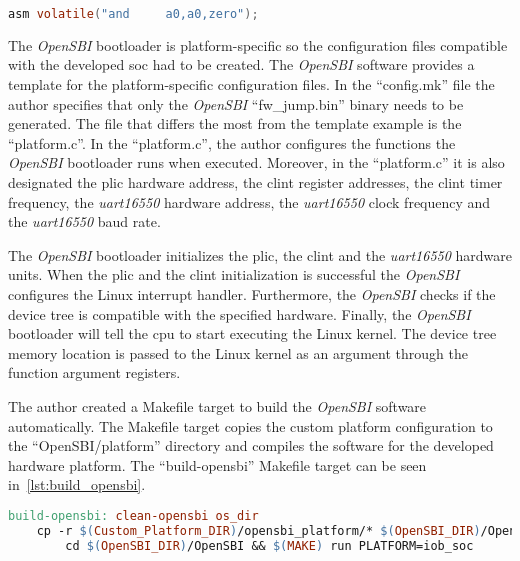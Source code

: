 \begin{lstlisting}[language=c, caption={Clear a function argument register.}, label=lst:clear_a_reg]
    asm volatile("and     a0,a0,zero");
\end{lstlisting}

The \textit{OpenSBI} bootloader is platform-specific so the configuration files compatible with the developed \acrshort{soc} had to be created. The \textit{OpenSBI} software provides a template for the platform-specific configuration files. In the \enquote{config.mk} file the author specifies that only the \textit{OpenSBI} \enquote{fw\_jump.bin} binary needs to be generated. The file that differs the most from the template example is the \enquote{platform.c}. In the \enquote{platform.c}, the author configures the functions the \textit{OpenSBI} bootloader runs when executed. Moreover, in the \enquote{platform.c} it is also designated the \acrshort{plic} hardware address, the \acrshort{clint} register addresses, the \acrshort{clint} timer frequency, the \textit{\acrshort{uart}16550} hardware address, the \textit{\acrshort{uart}16550} clock frequency and the \textit{\acrshort{uart}16550} baud rate.

The \textit{OpenSBI} bootloader initializes the \acrshort{plic}, the \acrshort{clint} and the \textit{\acrshort{uart}16550} hardware units. When the \acrshort{plic} and the \acrshort{clint} initialization is successful the \textit{OpenSBI} configures the Linux interrupt handler. Furthermore, the \textit{OpenSBI} checks if the device tree is compatible with the specified hardware. Finally, the \textit{OpenSBI} bootloader will tell the \acrshort{cpu} to start executing the Linux kernel. The device tree memory location is passed to the Linux kernel as an argument through the function argument registers.

The author created a Makefile target to build the \textit{OpenSBI} software automatically. The Makefile target copies the custom platform configuration to the \enquote{OpenSBI/platform} directory and compiles the software for the developed hardware platform. The \enquote{build-opensbi} Makefile target can be seen in~\ref{lst:build_opensbi}.

\begin{lstlisting}[language=make, caption={Makefile target to build OpenSBI.}, label=lst:build_opensbi]
build-opensbi: clean-opensbi os_dir
    cp -r $(Custom_Platform_DIR)/opensbi_platform/* $(OpenSBI_DIR)/OpenSBI/platform/ && \
        cd $(OpenSBI_DIR)/OpenSBI && $(MAKE) run PLATFORM=iob_soc
\end{lstlisting}

